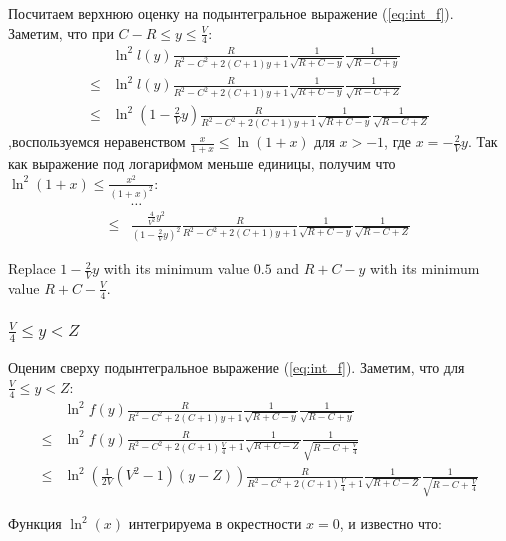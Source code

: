 Посчитаем верхнюю оценку на подынтегральное выражение (\ref{eq:int_f}). Заметим, что при $C - R \le y \le \frac{V}{4}$:
\begin{align*}
       & \ln^2 l(y) \frac{R}{R^2 - C^2 + 2 (C + 1) y + 1} \frac{1}{\sqrt{R + C - y}} \frac{1}{\sqrt{R - C + y}}
\\ \le & \ln^2 l(y) \frac{R}{R^2 - C^2 + 2 (C + 1) y + 1} \frac{1}{\sqrt{R + C - y}} \frac{1}{\sqrt{R - C + Z}}
\\ \le & \ln^2 (1 - \frac{2}{V} y) \frac{R}{R^2 - C^2 + 2 (C + 1) y + 1} \frac{1}{\sqrt{R + C - y}} \frac{1}{\sqrt{R - C + Z}}
\end{align*}
,воспользуемся неравенством $\frac{x}{1 + x} \le \ln (1 + x)$ для $x > -1$, где $x = -\frac{2}{V} y$. Так как выражение под логарифмом меньше единицы, получим что $\ln^2 (1 + x) \le \frac{x^2}{(1 + x)^2}$:
\begin{align*}
       & \dots 
\\ \le & \frac{\frac{4}{V^2}y^2}{(1 - \frac{2}{V}y)^2}  \frac{R}{R^2 - C^2 + 2 (C + 1) y + 1} \frac{1}{\sqrt{R + C - y}} \frac{1}{\sqrt{R - C + Z}}
\end{align*}

Replace $1 - \frac{2}{V}y$ with its minimum value $0.5$ and $R + C - y$ with its minimum value $R + C - \frac{V}{4}$.


\subsubsection{$\frac{V}{4} \le y < Z$}

Оценим сверху подынтегральное выражение (\ref{eq:int_f}). Заметим, что для $\frac{V}{4} \le y < Z$:
\begin{align*}
    & \ln^2 f(y) \frac{R}{R^2 - C^2 + 2 (C + 1) y + 1} \frac{1}{\sqrt{R + C - y}} \frac{1}{\sqrt{R - C + y}} 
\\ \le & \ln^2 f(y) \frac{R}{R^2 - C^2 + 2 (C + 1) \frac{V}{4} + 1} \frac{1}{\sqrt{R + C - Z}} \frac{1}{\sqrt{R - C + \frac{V}{4}}}
\\ \le & \ln^2 \left( \frac{1}{2 V}(V^2 - 1) (y - Z) \right) \frac{R}{R^2 - C^2 + 2 (C + 1) \frac{V}{4} + 1} \frac{1}{\sqrt{R + C - Z}} \frac{1}{\sqrt{R - C + \frac{V}{4}}}
\end{align*}

Функция $\ln^2(x)$ интегрируема в окрестности $x = 0$, и известно что: %

